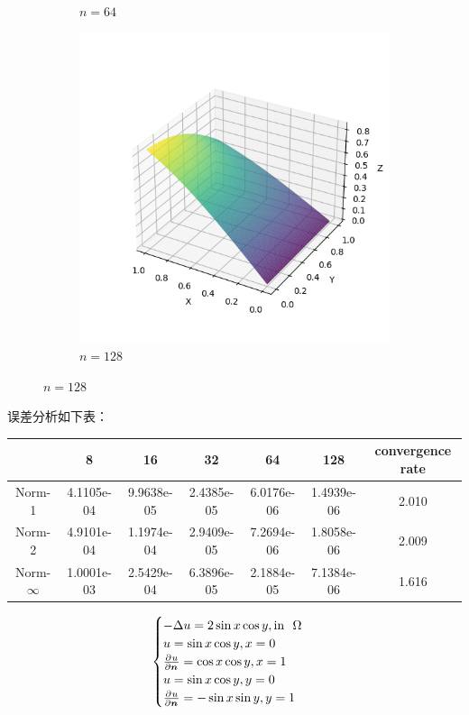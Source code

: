 \documentclass[lang=cn,a4paper,newtx,bibend=bibtex]{elegantpaper}
\begin{document}
\begin{figure}[H]
\begin{subfigure}[b]{0.18\textwidth}
      \caption{$n = 64$}
  \end{subfigure}
  \hfill
  \begin{subfigure}[b]{0.18\textwidth}
      \includegraphics[width=\textwidth]{../../res_bac/res-[data|2-Neumann-regular-e128].png}
      \caption{$n = 128$}
  \end{subfigure}
\end{figure}

误差分析如下表：

\begin{table}[H]
  \centering
  \begin{tabular}{|c|c|c|c|c|c|c|}
  \hline
   & 8 & 16 & 32 & 64 & 128 & convergence rate \\
  \hline
  Norm-1 & 4.1105e-04 & 9.9638e-05 & 2.4385e-05 & 6.0176e-06 & 1.4939e-06 & 2.010 \\
  Norm-2 & 4.9101e-04 & 1.1974e-04 & 2.9409e-05 & 7.2694e-06 & 1.8058e-06 & 2.009 \\
  Norm-$\infty$ & 1.0001e-03 & 2.5429e-04 & 6.3896e-05 & 2.1884e-05 & 7.1384e-06 & 1.616 \\
  \hline
  \end{tabular}
  \end{table}


\[
\begin{cases}
  - \Delta u = 2\sin x \cos y, \text{in~~} \Omega \\
  u = \sin x \cos y, x = 0 \\
  \frac{\partial^{}{u}}{\partial {\bm{n}}^{}} = \cos x \cos y, x = 1 \\  
  u = \sin x \cos y, y = 0 \\
  \frac{\partial^{}{u}}{\partial {\bm{n}}^{}} = - \sin x \sin y, y = 1 \\  
\end{cases}
\]
\end{document}
